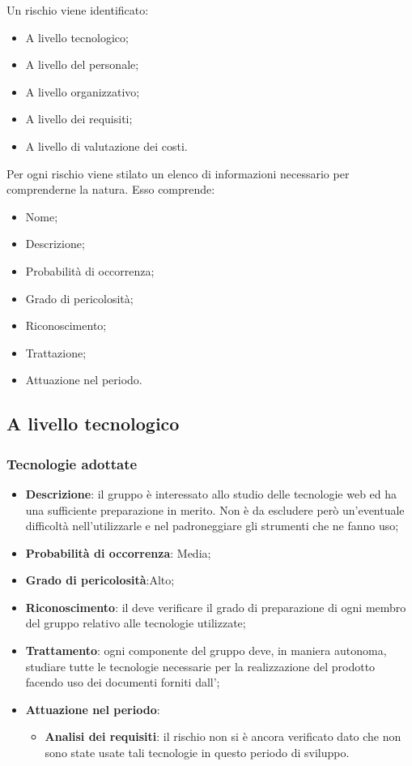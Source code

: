 	Un rischio viene identificato: 
	
	\begin{itemize}
		\item A livello tecnologico; 
		\item A livello del personale;
		\item A livello organizzativo;
		\item A livello dei requisiti;
		\item A livello di valutazione dei costi.
	\end{itemize}
	
	Per ogni rischio viene stilato un elenco di informazioni necessario per comprenderne la natura. Esso comprende: 
	
	\begin{itemize}
		\item Nome; 
		\item Descrizione;
		\item Probabilità di occorrenza;
		\item Grado di pericolosità;
		\item Riconoscimento;
		\item Trattazione;
		\item Attuazione nel periodo.
	\end{itemize}

	\subsection{A livello tecnologico}
	
		\subsubsection{Tecnologie adottate}
		\begin{itemize}
			\item \textbf{Descrizione}: il gruppo è interessato allo studio delle tecnologie web ed ha una sufficiente preparazione in merito. Non è da escludere però un'eventuale difficoltà nell'utilizzarle e nel padroneggiare gli strumenti che ne fanno uso;
			\item \textbf{Probabilità di occorrenza}: Media;
			\item \textbf{Grado di pericolosità}:Alto;
			\item \textbf{Riconoscimento}: il \textif{\Resp} deve verificare il grado di preparazione di ogni membro del gruppo relativo alle tecnologie utilizzate;	
			\item \textbf{Trattamento}: ogni componente del gruppo deve, in maniera autonoma, studiare tutte le tecnologie necessarie per la realizzazione del prodotto facendo uso dei documenti forniti dall'\textif{\Amm};
			\item \textbf{Attuazione nel periodo}:
				\begin{itemize}
					\item \textbf{Analisi dei requisiti}: il rischio non si è ancora verificato dato che non sono state usate tali tecnologie in questo periodo di sviluppo.
				\end{itemize}
		\end{itemize}
		
